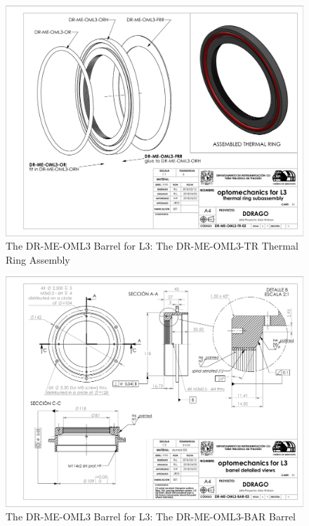 \documentclass{article}
\begin{document}
\begin{figure}
\begin{center}
\includegraphics[height=\linewidth,angle=90]{figures/DR-ME-OML3-TR-02}
\end{center}
\caption{The DR-ME-OML3 Barrel for L3: The DR-ME-OML3-TR Thermal Ring Assembly}
\label{figure:rosalia-oml3-thermal-ring}
\end{figure}

\begin{figure}
\begin{center}
\includegraphics[height=\linewidth,angle=90]{figures/DR-ME-OML3-BAR-03}
\end{center}
\caption{The DR-ME-OML3 Barrel for L3: The DR-ME-OML3-BAR Barrel}
\label{figure:rosalia-oml3-bar}
\end{figure}
\end{document}
